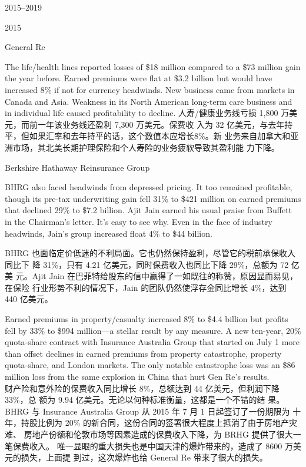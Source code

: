 \begin{chapter}{2015--2019}
\begin{section}{2015}
\begin{subsection}{General Re}
\begin{verseparallel}
  {
    The life/health lines reported losses of \$18 million compared to a \$73
    million gain the year before. Earned premiums were flat at \$3.2 billion but
    would have increased 8\% if not for currency headwinds. New business came
    from markets in Canada and Asia. Weakness in its North American long-term
    care business and in individual life caused profitability to decline.
  }
  {
    人寿/健康业务线亏损 1,800 万美元，而前一年该业务线还盈利 7,300 万美元。保费收
    入为 32 亿美元，与去年持平，但如果汇率和去年持平的话，这个数值本应增长8\%。新
    业务来自加拿大和亚洲市场，其北美长期护理保险和个人寿险的业务疲软导致其盈利能
    力下降。
  }
\end{verseparallel}
\end{subsection}


\begin{subsection}{Berkshire Hathaway Reinsurance Group}
\begin{verseparallel}
  {

    BHRG also faced headwinds from depressed pricing. It too remained
    profitable, though its pre-tax underwriting gain fell 31\% to \$421 million on
    earned premiums that declined 29\% to \$7.2 billion. Ajit Jain earned his
    usual praise from Buffett in the Chairman's letter. It's easy to see why.
    Even in the face of industry headwinds, Jain's group increased float
    4\% to \$44 billion. \\
  }
  {
    BHRG 也面临定价低迷的不利局面。它也仍然保持盈利，尽管它的税前承保收入同比下
    降 31\%，只有 4.21 亿美元，同时保费收入也同比下降 29\%，总额为 72 亿美
    元。Ajit Jain 在巴菲特给股东的信中赢得了一如既往的称赞，原因显而易见，在保险
    行业形势不利的情况下，Jain 的团队仍然使浮存金同比增长 4\%，达到 440 亿美元。
  }
\end{verseparallel}

\begin{verseparallel}
  {
    Earned premiums in property/casualty increased 8\% to \$4.4 billion but
    profits fell by 33\% to \$994 million—a stellar result by any measure. A new
    ten-year, 20\% quota-share contract with Insurance Australia Group that
    started on July 1 more than offset declines in earned premiums from property
    catastrophe, property quota-share, and London markets. The only notable
    catastrophe loss was an \$86 million loss from the same explosion in China
    that hurt Gen Re's results. \\
  }
  {
    财产险和意外险的保费收入同比增长 8\%，总额达到 44 亿美元，但利润下降 33\%，总
    额为 9.94 亿美元。无论以何种标准衡量，这都是一个不错的结
    果。BHRG 与 Insurance Australia Group 从 2015 年 7 月 1 日起签订了一份期限为
    十年，持股比例为 20\% 的新合同，这份合同的签署很大程度上抵消了由于房地产灾难、
    房地产份额和伦敦市场等因素造成的保费收入下降，为 BRHG 提供了很大一笔保费收入。
    唯一显眼的重大损失也是中国天津的爆炸带来的，造成了 8600 万美元的损失，上面提
    到过，这次爆炸也给 General Re 带来了很大的损失。
  }
\end{verseparallel}


\end{subsection}
\end{section}
\end{chapter}
